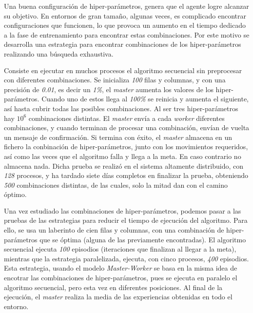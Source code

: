 		
		
		
		Una buena configuración de hiper-parámetros, genera que el agente logre alcanzar su objetivo. En entornos de gran tamaño, algunas veces, es complicado encontrar configuraciones que funcionen, lo que provoca un aumento en el tiempo dedicado a la fase de entrenamiento para encontrar estas combinaciones. Por este motivo se desarrolla una estrategia para encontrar combinaciones de los hiper-parámetros realizando una búsqueda exhaustiva. 
		
		Consiste en ejecutar en muchos procesos el algoritmo secuencial sin preprocesar con diferentes combinaciones. Se inicializa \textit{100} filas y columnas, y con una precisión de \textit{0.01}, es decir un \textit{1\%}, el \textit{master} aumenta los valores de los hiper-parámetros. Cuando uno de estos llega al \textit{100\%} se reinicia y aumenta el siguiente, así hasta cubrir todas las posibles combinaciones. Al ser tres hiper-parámetros hay \(10^{6}\) combinaciones distintas. El \textit{master} envía a cada \textit{worker} diferentes combinaciones, y cuando terminan de procesar una combinación, envían de vuelta un mensaje de confirmación. Si termina con éxito, el \textit{master} almacena en un fichero la conbinación de hiper-parámetros, junto con los movimientos requeridos, así como las veces que el algoritmo falla y llega a la meta. En caso contrario no almacena nada. Dicha prueba se realizó en el sistema altamente distribuido, con \textit{128} procesos, y ha tardado siete días completos en finalizar la prueba, obteniendo \textit{500} combinaciones distintas, de las cuales, solo la mitad dan con el camino óptimo.
		


		
	
	
		Una vez estudiado las combinaciones de hiper-parámetros, podemos pasar a las pruebas de las estrategias para reducir el tiempo de ejecución del algoritmo. Para ello, se usa un laberinto de cien filas y columnas, con una combinación de hiper-parámetros que se óptima (alguna de las previamente encontradas). El algoritmo secuencial ejecuta \textit{100} episodios (iteraciones que finalizan al llegar a la meta), mientras que la estrategia paralelizada, ejecuta, con cinco procesos, \textit{400} episodios. Esta estrategia, usando el modelo \textit{Master-Worker} se basa en la misma idea de encotrar las combinaciones de hiper-parámetros, pues se ejecuta en paralelo el algoritmo secuencial, pero esta vez en diferentes posiciones. Al final de la ejecución, el \textit{master} realiza la media de las experiencias obtenidas en todo el entorno. 
		
